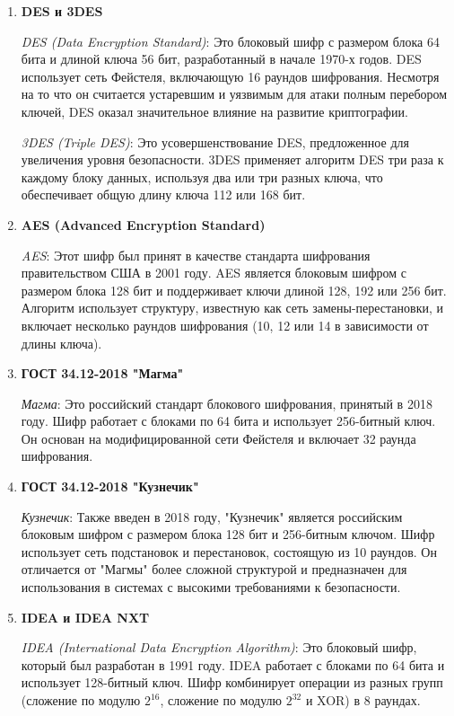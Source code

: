 \documentclass[colorthm]{../civarticle}
\begin{document}
\begin{enumerate}
\item \textbf{DES и 3DES}

\textit{DES (Data Encryption Standard)}: Это блоковый шифр с размером блока 64 бита и длиной ключа 56 бит, разработанный в начале 1970-х годов. DES использует сеть Фейстеля, включающую 16 раундов шифрования. Несмотря на то что он считается устаревшим и уязвимым для атаки полным перебором ключей, DES оказал значительное влияние на развитие криптографии.

\textit{3DES (Triple DES)}: Это усовершенствование DES, предложенное для увеличения уровня безопасности. 3DES применяет алгоритм DES три раза к каждому блоку данных, используя два или три разных ключа, что обеспечивает общую длину ключа 112 или 168 бит.

\item \textbf{AES (Advanced Encryption Standard)}

\textit{AES}: Этот шифр был принят в качестве стандарта шифрования правительством США в 2001 году. AES является блоковым шифром с размером блока 128 бит и поддерживает ключи длиной 128, 192 или 256 бит. Алгоритм использует структуру, известную как сеть замены-перестановки, и включает несколько раундов шифрования (10, 12 или 14 в зависимости от длины ключа).

\item \textbf{ГОСТ 34.12-2018 "Магма"}

\textit{Магма}: Это российский стандарт блокового шифрования, принятый в 2018 году. Шифр работает с блоками по 64 бита и использует 256-битный ключ. Он основан на модифицированной сети Фейстеля и включает 32 раунда шифрования. 

\item \textbf{ГОСТ 34.12-2018 "Кузнечик"}

\textit{Кузнечик}: Также введен в 2018 году, "Кузнечик" является российским блоковым шифром с размером блока 128 бит и 256-битным ключом. Шифр использует сеть подстановок и перестановок, состоящую из 10 раундов. Он отличается от "Магмы" более сложной структурой и предназначен для использования в системах с высокими требованиями к безопасности.

\item \textbf{IDEA и IDEA NXT}

\textit{IDEA (International Data Encryption Algorithm)}: Это блоковый шифр, который был разработан в 1991 году. IDEA работает с блоками по 64 бита и использует 128-битный ключ. Шифр комбинирует операции из разных групп (сложение по модулю $2^{16}$, сложение по модулю $2^{32}$ и XOR) в 8 раундах.


\end{enumerate}
\end{document}
